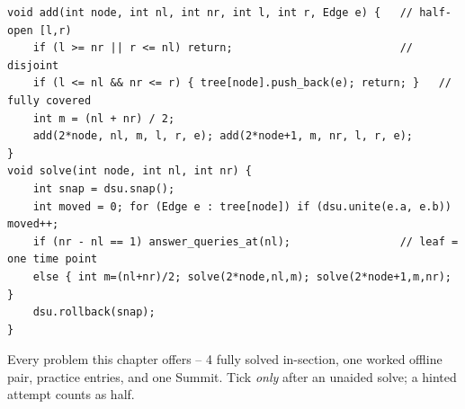 \begin{lstlisting}[caption={Drill 5 -- segment-tree-over-time cover (from lst:c28-segtree-time)}]
void add(int node, int nl, int nr, int l, int r, Edge e) {   // half-open [l,r)
    if (l >= nr || r <= nl) return;                          // disjoint
    if (l <= nl && nr <= r) { tree[node].push_back(e); return; }   // fully covered
    int m = (nl + nr) / 2;
    add(2*node, nl, m, l, r, e); add(2*node+1, m, nr, l, r, e);
}
void solve(int node, int nl, int nr) {
    int snap = dsu.snap();
    int moved = 0; for (Edge e : tree[node]) if (dsu.unite(e.a, e.b)) moved++;
    if (nr - nl == 1) answer_queries_at(nl);                 // leaf = one time point
    else { int m=(nl+nr)/2; solve(2*node,nl,m); solve(2*node+1,m,nr); }
    dsu.rollback(snap);
}
\end{lstlisting}
\noindent{\scriptsize Key: the cover is \([l,r)\) so each edge lands on
\(\bigO{\log T}\) nodes and appears exactly once on any live leaf's path
(\(\thmref{c28-dync}\)); snapshot-before, rollback-after keeps siblings
independent.}


Every problem this chapter offers -- 4 fully solved in-section, one worked
offline pair, practice entries, and one Summit. Tick \emph{only} after an
unaided solve; a hinted attempt counts as half.

